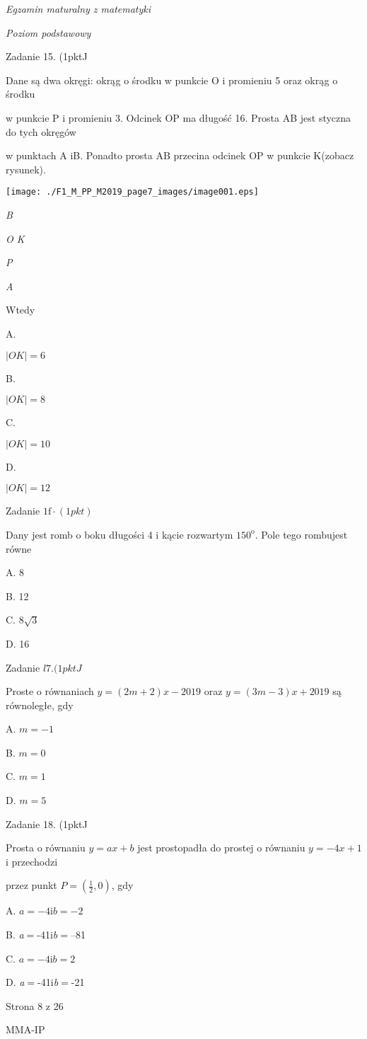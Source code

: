 \documentclass[a4paper,12pt]{article}
\begin{document}
{\it Egzamin maturalny z matematyki}

{\it Poziom podstawowy}

Zadanie 15. (1pktJ

Dane są dwa okręgi: okrąg o środku w punkcie O i promieniu 5 oraz okrąg o środku

w punkcie P i promieniu 3. Odcinek OP ma długość 16. Prosta AB jest styczna do tych okręgów

w punktach A iB. Ponadto prosta AB przecina odcinek OP w punkcie K(zobacz rysunek).
\begin{center}
\texttt{[image: ./F1\_M\_PP\_M2019\_page7\_images/image001.eps]}
\end{center}
{\it B}

{\it O  K}

{\it P}

{\it A}

Wtedy

A.

$|OK|=6$

B.

$|OK|=8$

C.

$|OK|=10$

D.

$|OK|=12$

Zadanie $1\mathrm{f}\cdot(1pkt)$

Dany jest romb o boku długości 4 i kącie rozwartym $150^{\mathrm{o}}$. Pole tego rombujest równe

A. 8

B. 12

C. $8\sqrt{3}$

D. 16

Zadanie $l7. (1pktJ$

Proste o równaniach $y=(2m+2)x-2019$ oraz $y=(3m-3)x+2019$ są równoległe, gdy

A. $m=-1$

B. $m=0$

C. $m=1$

D. $m=5$

Zadanie 18. (1pktJ

Prosta o równaniu $y=ax+b$ jest prostopadła do prostej o równaniu $y=-4x+1$ i przechodzi

przez punkt $P=(\displaystyle \frac{1}{2},0)$, gdy

A. $a=-4\mathrm{i}b=-2$

B. {\it a}$=$-41i{\it b}$=$--81

C. $a=-4\mathrm{i}b=2$

D. {\it a}$=$-41i{\it b}$=$-21

Strona 8 z 26

MMA-IP
\end{document}
